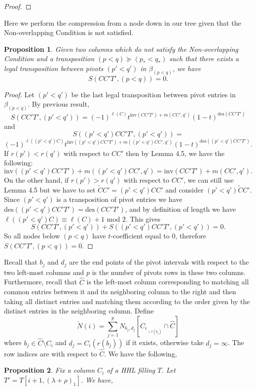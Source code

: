 \documentclass[11pt]{amsart}
\newtheorem{prop}{Proposition}[section]
\begin{document}
{\begin{proof}
\end{proof}
Here we perform the compression from a node down in our tree given that the Non-overlapping Condition is not satisfied. 
\begin{prop}
Given two columns which do not satisfy the Non-overlapping Condition and a transposition $(p<q)\succeq (p_{*}<q_{*})$ such that there exists a legal transposition between pivots $(p'<q')$ in $\beta_{(p<q)}$, we have 
\[
S(CC'T',(p<q))=0.
\]
\end{prop}
\begin{proof}
Let $(p'<q')$ be the last legal transposition between pivot entries in $\beta_{(p<q)}$. By previous result,
\[
S(CC'T',(p'<q'))=
(-1)^{\ell(C)}t^{\text{inv}(CC'T')+m(CC',q')}(1-t)^{\text{des}(CC'T')}
\]
and 
\[
S((p'<q')CC'T',(p'<q'))=
\]
\[
(-1)^{\ell((p'<q')C)}t^{\text{inv}((p'<q')CC'T')+m((p'<q')CC',q')}(1-t)^{\text{des}((p'<q')CC'T')}.
\]
If $r(p')<r(q')$ with respect to $CC'$ then by Lemma 4.5, we have the following:
\[
\text{inv}((p'<q')CC'T')+m((p'<q')CC',q')=\text{inv}(CC'T')+m(CC',q').
\]
On the other hand, if $r(p')>r(q')$ with respect to $CC'$, we can still use Lemma 4.5 but we have to set $\widetilde{C}C'=(p'<q')CC'$ and consider $(p'<q')\widetilde{C}C'$.
\newline\indent Since $(p'<q')$ is a transposition of pivot entries we have $ \text{des}((p'<q')CC'T')=\text{des}(CC'T')$, and by definition of length we have $\ell((p'<q')C)\equiv\ell(C)+1\text{ mod }2$. This gives
\[
S(CC'T',(p'<q'))+S((p'<q')CC'T',(p'<q'))=0.
\]
So all nodes below $(p<q)$ have $t$-coefficient equal to $0$, therefore $S(CC'T',(p<q))=0$.
\end{proof}
\indent  Recall that $b_{j}$ and $d_{j}$ are the end points of the pivot intervals with respect to the two left-most columns and $p$ is the number of pivots rows in these two columns. Furthermore, recall that $\widehat{C}$ is the left-most column corresponding to matching all common entries between it and its neighboring column to the right and then taking all distinct entries and matching them according to the order given by the distinct entries in the neighboring column. Define  
\[
\check{N}(i)=\sum_{j=1}^{p}N_{b_{j},d_{j}}[C_{i_{>r(b_{j})}}\cap \widehat{C}]
\]
where $b_{j} \in \widehat{C}\setminus C_{i}$ and $d_{j}=C_{i}(r(b_{j}))$ if it exists, otherwise take $d_{j}=\infty$. The row indices are with respect to $\widehat{C}$. 
We have the following,
\begin{prop} Fix a column $C_{i}$ of a HHL filling $T$. Let $T'=T[i+1,(\lambda+\rho)_{1}]$. We have, 

\end{prop}}
\end{document}
